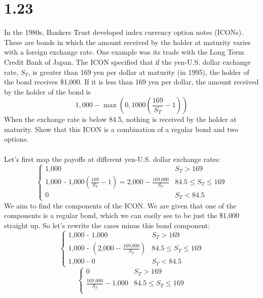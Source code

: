 \documentclass{article}
\begin{document}
{\Large 

\section*{1.23}

In the 1980s, Bankers Trust developed index currency option notes (ICONs). These are bonds in which the amount received by the holder at maturity varies with a foreign exchange rate. One example was its trade with the Long Term Credit Bank of Japan. The ICON specified that if the yen-U.S. dollar exchange rate, \(S_T\), is greater than 169 yen per dollar at maturity (in 1995), the holder of the bond receives \$1,000. If it is less than 169 yen per dollar, the amount received by the holder of the bond is
\[
  1,000 - \max(0, 1000(\frac{169}{S_T} - 1))
\]
When the exchange rate is below 84.5, nothing is received by the holder at maturity. Show that this ICON is a combination of a regular bond and two options. \\ \\
Let's first map the payoffs at different yen-U.S. dollar exchange rates: \\
\begin{equation*}
  \begin{cases}
    \text{1,000} & S_T > 169 \\
    \text{1,000 - 1,000}(\frac{169}{S_T} - 1) = \text{2,000} - \frac{\text{169,000}}{S_T} & 84.5 \leq S_T \leq 169 \\
    0 & S_T < 84.5
  \end{cases}  
\end{equation*}
We aim to find the components of the ICON. We are given that one of the components is a regular bond, which we can easily see to be just the \$1,000 straight up. So let's rewrite the cases minus this bond component:
\begin{equation*}
  \begin{cases}
    \text{1,000 - 1,000} & S_T > 169 \\
    \text{1,000 - } (\text{2,000} - \frac{\text{169,000}}{S_T}) & 84.5 \leq S_T \leq 169 \\
    \text{1,000 - 0} & S_T < 84.5
  \end{cases}  
\end{equation*}
\begin{equation*}
  \begin{cases}
    0 & S_T > 169 \\
    \frac{\text{169,000}}{S_T} - \text{1,000} & 84.5 \leq S_T \leq 169 \\

\end{cases}
\end{equation*}}
\end{document}
